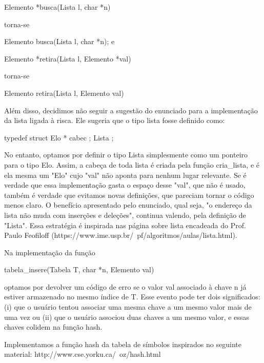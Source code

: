 \documentclass{article}
\begin{document}
\begin{spverbatim}
  Elemento *busca(Lista l, char *n)
\end{spverbatim} \medskip
torna-se
\begin{spverbatim}
  Elemento busca(Lista l, char *n); e
\end{spverbatim} \medskip

\begin{spverbatim}
  Elemento *retira(Lista l, Elemento *val)
\end{spverbatim} \medskip
torna-se
\begin{spverbatim}
  Elemento retira(Lista l, Elemento val)
\end{spverbatim} \medskip

Além disso, decidimos não seguir a sugestão do enunciado para a implementação da lista ligada à risca. Ele sugeria que o tipo lista fosse definido como:

\begin{spverbatim}
  typedef struct {
  Elo * cabec ;
} Lista ;
\end{spverbatim} \medskip

No entanto, optamos por definir o tipo Lista simplesmente como um ponteiro para o tipo Elo. Assim, a cabeça de toda lista é criada pela função cria\_lista, e é ela mesma um "Elo" cujo "val" não aponta para nenhum lugar relevante. Se é verdade que essa implementação gasta o espaço desse "val", que não é usado, também é verdade que evitamos novas definições, que pareciam tornar o código menos claro. O benefício apresentado pelo enunciado, qual seja, "o endereço da lista não muda com inserções e deleções", continua valendo, pela definição de "Lista". Essa estratégia é inspirada nas página sobre lista encadeada do Prof. Paulo Feofiloff (https://www.ime.usp.br/~pf/algoritmos/aulas/lista.html).

Na implementação da função
\begin{spverbatim}
  tabela_insere(Tabela T, char *n, Elemento val)
\end{spverbatim} \medskip
optamos por devolver um código de erro se o valor val associado à chave n já estiver armazenado no mesmo índice de T. Esse evento pode ter dois significados: (i) que o usuário tentou associar uma mesma chave a um mesmo valor mais de uma vez ou (ii) que o usuário associou duas chaves a um mesmo valor, e essas chaves colidem na função hash.

Implementamos a função hash da tabela de símbolos inspirados no seguinte material: http://www.cse.yorku.ca/~oz/hash.html 
\end{document}
